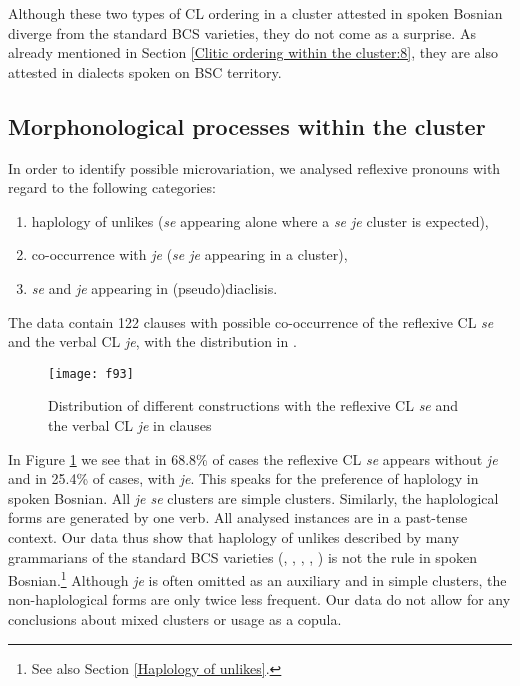 
\noindent Although these two types of CL ordering in a cluster attested in spoken Bosnian diverge from the standard BCS varieties, they do not come as a surprise. As already mentioned in Section \ref{Clitic ordering within the cluster:8}, they are also attested in dialects spoken on BSC territory.

\subsection{Morphonological processes within the cluster}
\label{Chapter9:Morphonological processes within the cluster}

In order to identify possible microvariation, we analysed reflexive pronouns with regard to the following categories:
\begin{enumerate}
 \item haplology of unlikes (\textit{se} appearing alone where a \textit{se je} cluster is expected),
 \item co-occurrence with \textit{je} (\textit{se je} appearing in a cluster),
 \item \textit{se} and \textit{je} appearing in (pseudo)diaclisis. 
\end{enumerate}
 
 The data contain 122 clauses with possible co-occurrence of the reflexive CL \textit{se} and the verbal CL \textit{je}, with the distribution in .

\begin{figure}[ht]
\caption{Distribution of different constructions with the reflexive CL \textit{se} and the verbal CL \textit{je} in clauses}
\label{F.9.3}
\texttt{[image: f93]}
\end{figure}

In Figure \ref{F.9.3} we see that in 68.8\% of cases the reflexive CL \textit{se} appears without \textit{je} and in 25.4\% of cases, with \textit{je}. This speaks for the preference of haplology in spoken Bosnian. All \textit{je se} clusters are simple clusters. Similarly, the haplological forms are generated by one verb. All analysed instances are in a past-tense context. Our data thus show that haplology of unlikes described by many grammarians of the standard BCS varieties (\citealt[e.g.][246]{TezakBabic96}, \citealt[596]{Baric97}, \citealt[471]{JHP00}, \citealt[302, 333]{Ridjanovic12}, \citealt[450]{PiperKlajn14}) is not the rule in spoken Bosnian.\footnote{See also Section \ref{Haplology of unlikes}.} Although \textit{je} is often omitted as an auxiliary and in simple clusters, the non-haplological forms are only twice less frequent. Our data do not allow for any conclusions about mixed clusters or usage as a copula.

